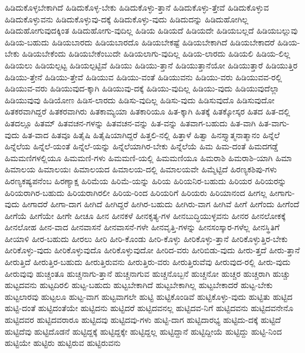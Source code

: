 {ಹಿಡಿದುಕೊಳ್ಳಬೇಕಾಗಿದೆ
ಹಿಡಿದುಕೊಳ್ಳ-ಬೇಕು
ಹಿಡಿದುಕೊಳ್ಳು-ತ್ತಾನೆ
ಹಿಡಿದುಕೊಳ್ಳು-ತ್ತೇವೆ
ಹಿಡಿದುಕೊಳ್ಳುವ
ಹಿಡಿದುಕೊಳ್ಳುವನು
ಹಿಡಿದುಕೊಳ್ಳುವು-ದಕ್ಕೆ
ಹಿಡಿದುಕೊಳ್ಳು-ವುದು
ಹಿಡಿದುದನ್ನು
ಹಿಡಿದುಹೋಗಿಲ್ಲ
ಹಿಡಿದುಹೋಗುವುದಕ್ಕಿಂತ
ಹಿಡಿದುಹೋಗು-ವುದಿಲ್ಲ
ಹಿಡಿಯ
ಹಿಡಿಯದೆ
ಹಿಡಿಯದೇ
ಹಿಡಿಯಬಲ್ಲದೆ
ಹಿಡಿಯಬಲ್ಲುವು
ಹಿಡಿಯ-ಬಹುದು
ಹಿಡಿಯಬಾರದು
ಹಿಡಿಯಬಾರದೊ
ಹಿಡಿಯಬೇಕಷ್ಟೆ
ಹಿಡಿಯಬೇಕಾಗಿದೆ
ಹಿಡಿಯಬೇಕಾದರೆ
ಹಿಡಿಯ-ಬೇಕು
ಹಿಡಿಯಬೇಕೆಂದು
ಹಿಡಿಯಬೇಕೆಂಬುದೇ
ಹಿಡಿಯಲಾಗು-ವುದಿಲ್ಲ
ಹಿಡಿಯ-ಲಾರದು
ಹಿಡಿಯಲಿ
ಹಿಡಿಯ-ಲಿಲ್ಲ
ಹಿಡಿಯಲು
ಹಿಡಿಯಲ್ಪಟ್ಟ
ಹಿಡಿಯಲ್ಪಟ್ಟಿವೆ
ಹಿಡಿಯು
ಹಿಡಿಯು-ತ್ತಾನೆ
ಹಿಡಿಯುತ್ತಾನೆಯೋ
ಹಿಡಿಯುತ್ತಾರೆ
ಹಿಡಿಯುತ್ತಿರ
ಹಿಡಿಯು-ತ್ತೇನೆ
ಹಿಡಿಯು-ತ್ತೇವೆ
ಹಿಡಿಯುವ
ಹಿಡಿಯು-ವಂತೆ
ಹಿಡಿಯುವನು
ಹಿಡಿಯು-ವರು
ಹಿಡಿಯುವವ-ರಲ್ಲಿ
ಹಿಡಿಯುವ-ವರು
ಹಿಡಿಯುವುದ-ಕ್ಕಾಗಿ
ಹಿಡಿಯುವು-ದಕ್ಕೆ
ಹಿಡಿಯು-ವುದಿಲ್ಲ
ಹಿಡಿಯು-ವುದು
ಹಿಡಿಯುವುದೆಲ್ಲಾ
ಹಿಡಿಯುವುವು
ಹಿಡಿಯೋಣ
ಹಿಡಿಸ-ಲಾರದು
ಹಿಡಿಸು-ವುದಿಲ್ಲ
ಹಿಡಿಸು-ವುದು
ಹಿಡಿಸುವುದೊ
ಹಿಡಿಸುವುದೋ
ಹಿತಕರವಾಗಿದ್ದರೆ
ಹಿತಕರವಾಗಿರು
ಹಿತಕಾಮ್ಯಯಾ
ಹಿತಕಾರಿಯೂ
ಹಿತ-ಕ್ಕಾಗಿ
ಹಿತಕ್ಕೆ
ಹಿತಕ್ಕೋಸ್ಕರ
ಹಿತದ
ಹಿತ-ದಲ್ಲಿ
ಹಿತದಲ್ಲೂ
ಹಿತಮ್
ಹಿತವಚನ-ಗಳನ್ನು
ಹಿತವಚನ-ವನ್ನು
ಹಿತ-ವನ್ನು
ಹಿತವಾಗ-ಬಹುದು
ಹಿತ-ವಾಗಿ
ಹಿತ-ವಾಗು-ವುದು
ಹಿತ-ವಾದ
ಹಿತವೂ
ಹಿತೈಷಿ
ಹಿತೈಷಿಯಾಗಿದ್ದರೆ
ಹಿತ್ತಲಿ-ನಲ್ಲಿ
ಹಿತ್ತಾಳೆ
ಹಿತ್ವಾ
ಹಿನಸ್ತ್ಯಾತ್ಮನಾತ್ಮಾನಂ
ಹಿನ್ನೆಲೆ
ಹಿನ್ನೆಲೆಯ
ಹಿನ್ನೆಲೆ-ಯಂತೆ
ಹಿನ್ನೆಲೆ-ಯನ್ನು
ಹಿನ್ನೆಲೆಯಾಗಿರ-ಬೇಕು
ಹಿನ್ನೆಲೆಯೆ
ಹಿಮ
ಹಿಮ-ದಂತೆ
ಹಿಮದಗಡ್ಡೆ
ಹಿಮಮಣಿಗಳಲ್ಲಿಯೂ
ಹಿಮಮಣಿ-ಗಳು
ಹಿಮಮಣಿ-ಯಲ್ಲಿ
ಹಿಮಮಣಿಯೂ
ಹಿಮರಾಶಿ
ಹಿಮರಾಶಿ-ಯಾಗಿ
ಹಿಮಾ
ಹಿಮಾಲಯ
ಹಿಮಾಲಯಃ
ಹಿಮಾಲಯದ
ಹಿಮಾಲಯ-ದಲ್ಲಿ
ಹಿಮಾಲಯವೇ
ಹಿಮ್ಮೆಟ್ಟಿದೆ
ಹಿರಣ್ಯಕಶಿಪು-ಗಳು
ಹಿರಣ್ಯಕಷ್ಯಪನೆಂಬ
ಹಿರಣ್ಯಾಕ್ಷ
ಹಿರಿಮೆಯ
ಹಿರಿಮೆ-ಯನ್ನು
ಹಿರಿಯ
ಹಿರಿಯನಿರ-ಬಹುದು
ಹಿರಿಯರ
ಹಿರಿಯರನ್ನು
ಹಿರಿಯರಾಗಿರ-ಬಹುದು
ಹಿರಿಯರಾಗಿರಲೀ
ಹಿರಿಯ-ರಿಂದ
ಹಿರಿಯರಿಗೆ
ಹಿರಿಯರು
ಹಿರಿಯಾನಂದ
ಹೀಗಲ್ಲ
ಹೀಗಾಗು-ವುದು
ಹೀಗಾದರೆ
ಹೀಗಾ-ದಾಗ
ಹೀಗಿದೆ
ಹೀಗಿದ್ದರೆ
ಹೀಗಿರ-ಬಹುದು
ಹೀಗಿರು-ವಾಗ
ಹೀಗಿವೆ
ಹೀಗೆ
ಹೀಗೆಂದು
ಹೀಗೆಂದೆ
ಹೀಗೆಯೆ
ಹೀಗೆಯೇ
ಹೀಗೇ
ಹೀಚೂ
ಹೀನ
ಹೀನಕಳೆ
ಹೀನಕೃತ್ಯ-ಗಳ
ಹೀನಬುದ್ಧಿಯುಳ್ಳವನು
ಹೀನರ
ಹೀನಲೋಕಕ್ಕೆ
ಹೀನಲೋಹ
ಹೀನ-ವಾದ
ಹೀನವಾಸನೆ
ಹೀನವಾಸನೆ-ಗಳೇ
ಹೀನವೃತ್ತಿ-ಗಳನ್ನು
ಹೀನಸಂಸ್ಕಾರ-ಗಳೆಲ್ಲ
ಹೀನಸ್ಥಿತಿಗೆ
ಹೀಯಾಳಿ
ಹೀರ-ಬಹುದು
ಹೀರಲು
ಹೀರಿ
ಹೀರಿ-ಕೊಂಡು
ಹೀರಿ-ಕೊಳ್ಳು
ಹೀರಿಕೊಳ್ಳು-ತ್ತಾನೆ
ಹೀರಿಕೊಳ್ಳುತ್ತಿರ-ಬೇಕು
ಹೀರಿಕೊಳ್ಳು-ವುದು
ಹೀರಿಕೊಳ್ಳುವುದೊ
ಹೀರಿಕೊಳ್ಳುವುದೋ
ಹೀರಿದ-ವರು
ಹೀರಿಬಿಡು-ವುದು
ಹೀರು-ತ್ತದೆ
ಹೀರು-ತ್ತಾನೆ
ಹೀರುತ್ತಿದೆ
ಹೀರುತ್ತಿರ-ಬಹುದು
ಹೀರುತ್ತಿರುವನು
ಹೀರುತ್ತಿರು-ವರು
ಹೀರುತ್ತಿರುವೆವು
ಹೀರುವುದ-ರಲ್ಲಿ
ಹೀರು-ವುದು
ಹೀರುವುವು
ಹುಚ್ಚಂತೂ
ಹುಚ್ಚನಾಗು-ತ್ತಾನೆ
ಹುಚ್ಚನಾಗುವ
ಹುಚ್ಚನೊಬ್ಬನೆ
ಹುಚ್ಚನೋ
ಹುಚ್ಚರ
ಹುಚ್ಚರಾಗಿ
ಹುಚ್ಚು
ಹುಟ್ಟದವನು
ಹುಟ್ಟದಿರಲಿ
ಹುಟ್ಟ-ಬಹುದು
ಹುಟ್ಟಬೇಕಾಗಿದೆ
ಹುಟ್ಟಬೇಕಾಗಿಲ್ಲ
ಹುಟ್ಟಬೇಕಾದರೆ
ಹುಟ್ಟ-ಬೇಕು
ಹುಟ್ಟಲಾರವು
ಹುಟ್ಟಲೂ
ಹುಟ್ಟ-ವಾಗ
ಹುಟ್ಟವಾಗಲೇ
ಹುಟ್ಟಿ
ಹುಟ್ಟಿಕೊಂಡಿವೆ
ಹುಟ್ಟಿಕೊಳ್ಳು-ವುದು
ಹುಟ್ಟಿತು
ಹುಟ್ಟಿದ
ಹುಟ್ಟಿ-ದಂತೆ
ಹುಟ್ಟಿದಂತೆಯೇ
ಹುಟ್ಟಿದನು
ಹುಟ್ಟಿದರೆ
ಹುಟ್ಟಿದವನಲ್ಲ
ಹುಟ್ಟಿದವ-ನಿಗೆ
ಹುಟ್ಟಿದವನು
ಹುಟ್ಟಿದವನೇನೊ
ಹುಟ್ಟಿದವರ
ಹುಟ್ಟಿದವರಾರೂ
ಹುಟ್ಟಿದವು
ಹುಟ್ಟಿದವು-ಗಳು
ಹುಟ್ಟಿ-ದಾಗ
ಹುಟ್ಟಿದಾರಭ್ಯ
ಹುಟ್ಟಿದು-ದಕ್ಕೆ
ಹುಟ್ಟಿದೆ
ಹುಟ್ಟಿದೆವು
ಹುಟ್ಟಿದೊಡನೆ
ಹುಟ್ಟಿದ್ದಕ್ಕೆ
ಹುಟ್ಟಿದ್ದಕ್ಕೇ
ಹುಟ್ಟಿದ್ದಲ್ಲ
ಹುಟ್ಟಿದ್ದಾನೆ
ಹುಟ್ಟಿದ್ದೀಯೆ
ಹುಟ್ಟಿದ್ದು
ಹುಟ್ಟಿ-ನಿಂದ
ಹುಟ್ಟಿಯೇ
ಹುಟ್ಟಿರು
ಹುಟ್ಟಿರುವ
ಹುಟ್ಟಿರುವನು
}
